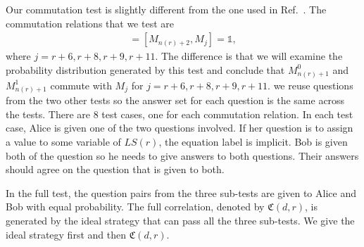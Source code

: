 \documentclass[11pt,letterpaper]{article}
\newcommand{\calY}{\mathcal{Y}}
\newcommand{\1}{\mathbb{1}}
\newcommand{\LS}{LS}
\newcommand{\nr}{n(r)}
\newcommand{\fC}{\mathfrak{C}}
\theoremstyle{definition}
\begin{document}
Our commutation test is slightly different from the one used in Ref.~\cite{coladan2017verifier}.
The commutation relations that we test are
\begin{align*}
    [M_{\nr+1}, M_j] = [M_{\nr+2}, M_j] = \1,
\end{align*}
where $j = r+6, r+8, r+9, r+11$.
The difference is that we will examine the probability distribution 
generated by this test and conclude that $M_{\nr+1}^0$ and $M_{\nr+1}^1$ commute with
$M_j$ for $j = r+6, r+8, r+9, r+11$.
we reuse questions from the two other tests so the answer
set for each question is the same across the tests.
There are $8$ test cases, one for each commutation relation.
In each test case, Alice is given one of the two questions involved.
If her question is to assign a value to some variable of $\LS(r)$,
the equation label is implicit.
Bob is given both of the question so he needs to give answers to both questions.
Their answers should agree on the question that is given to both.

In the full test, the question pairs from the three sub-tests are given to Alice and Bob with equal probability.
The full correlation, denoted by $\fC(d,r)$, is generated by the ideal strategy that can pass all the three sub-tests. We give the ideal strategy first and then $\fC(d,r)$.
\end{document}
